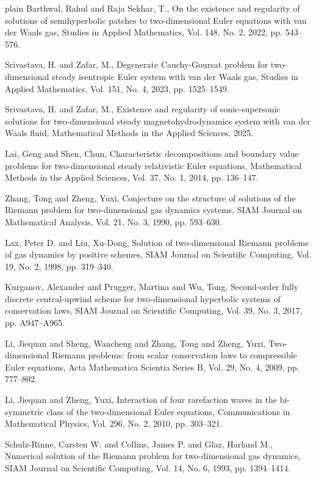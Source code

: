 \documentclass[3p,11pt]{elsarticle}
\numberwithin{equation}{section}
\begin{document}
\begin{thebibliography}{plain}
{Barthwal, Rahul and Raja Sekhar, T.,
On the existence and regularity of solutions of semihyperbolic patches to two-dimensional Euler equations with van der Waals gas,
Studies in Applied Mathematics, Vol. 148, No. 2, 2022, pp. 543--576}.

{Srivastava, H. and Zafar, M.,
Degenerate Cauchy-Goursat problem for two-dimensional steady isentropic Euler system with van der Waals gas,
Studies in Applied Mathematics, Vol. 151, No. 4, 2023, pp. 1525--1549}.

{Srivastava, H. and Zafar, M.,
Existence and regularity of sonic-supersonic solutions for two-dimensional steady magnetohydrodynamics system with van der Waals fluid,
Mathematical Methods in the Applied Sciences, 2025}.

{Lai, Geng and Shen, Chun,
Characteristic decompositions and boundary value problems for two-dimensional steady relativistic Euler equations,
Mathematical Methods in the Applied Sciences, Vol. 37, No. 1, 2014, pp. 136--147}.

{Zhang, Tong and Zheng, Yuxi,
Conjecture on the structure of solutions of the Riemann problem for two-dimensional gas dynamics systems,
SIAM Journal on Mathematical Analysis, Vol. 21, No. 3, 1990, pp. 593--630}.

{Lax, Peter D. and Liu, Xu-Dong,
Solution of two-dimensional Riemann problems of gas dynamics by positive schemes,
SIAM Journal on Scientific Computing, Vol. 19, No. 2, 1998, pp. 319--340}.

{Kurganov, Alexander and Prugger, Martina and Wu, Tong,
Second-order fully discrete central-upwind scheme for two-dimensional hyperbolic systems of conservation laws,
SIAM Journal on Scientific Computing, Vol. 39, No. 3, 2017, pp. A947--A965}.

{Li, Jiequan and Sheng, Wancheng and Zhang, Tong and Zheng, Yuxi,
Two-dimensional Riemann problems: from scalar conservation laws to compressible Euler equations,
Acta Mathematica Scientia Series B, Vol. 29, No. 4, 2009, pp. 777--802}.

{Li, Jiequan and Zheng, Yuxi,
Interaction of four rarefaction waves in the bi-symmetric class of the two-dimensional Euler equations,
Communications in Mathematical Physics, Vol. 296, No. 2, 2010, pp. 303--321}.

{Schulz-Rinne, Carsten W. and Collins, James P. and Glaz, Harland M.,
Numerical solution of the Riemann problem for two-dimensional gas dynamics,
SIAM Journal on Scientific Computing, Vol. 14, No. 6, 1993, pp. 1394--1414}.


\end{thebibliography}
\end{document}
